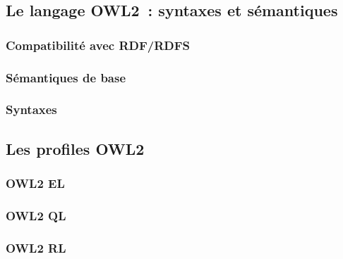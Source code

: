 \subsection{Le langage OWL2~: syntaxes et sémantiques}
\label{sec:semantic-web-owl2-syntax-semantics}

\subsubsection{Compatibilité avec RDF/RDFS}
\label{sec:semantic-web-owl2-rdf-rdfs}

\subsubsection{Sémantiques de base}
\label{sec:semantic-web-owl2-semantics}

\subsubsection{Syntaxes}
\label{sec:semantic-web-owl2-syntax}

\subsection{Les profiles OWL2}
\label{sec:semantic-web-owl2-profiles}
\cite{motik2009owl}

\subsubsection{OWL2 EL}
\label{sec:semantic-web-owl2-el}

\subsubsection{OWL2 QL}
\label{sec:semantic-web-owl2-ql}

\subsubsection{OWL2 RL}
\label{sec:semantic-web-owl2-rl}

